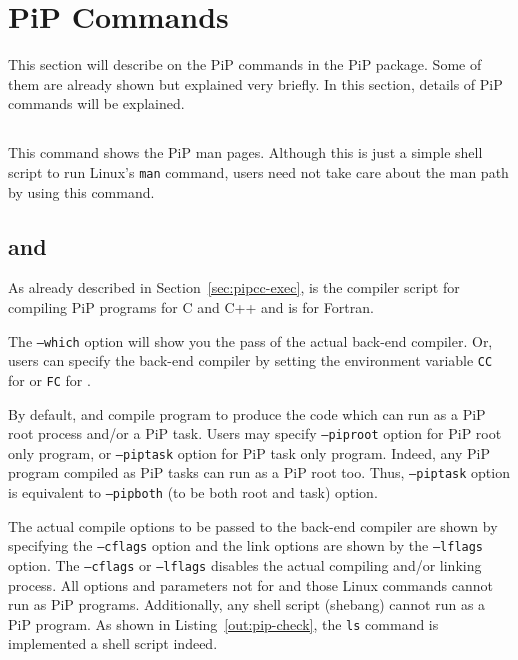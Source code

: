 
\section{PiP Commands}

This section will describe on the PiP commands in the PiP
package. Some of them are already shown but explained very briefly. In
this section, details of PiP commands will be explained.

\subsection{}\label{sec:pip-man}

This command shows the PiP man pages. Although this is just a simple
shell script to run Linux's {\tt man} command, users need not take 
care about the man path by using this command.

\subsection{ and }

As already described in Section~\ref{sec:pipcc-exec}, 
is the compiler script for compiling PiP programs for C and C++ and
 is for Fortran.

The {\tt --which} option will show you the pass of the actual back-end
compiler. Or, users can specify the back-end compiler by setting the 
environment variable {\tt CC} for  or {\tt FC} for
.

By default,  and  compile program to
produce the code which can run as a PiP root process and/or a PiP
task. Users may specify {\tt --piproot} option for PiP root only
program, or {\tt --piptask} option for PiP task only program. Indeed,
any PiP program compiled as PiP tasks can run as a PiP root too. Thus,
{\tt --piptask} option is equivalent to {\tt --pipboth} (to
be both root and task) option.

The actual compile options to be passed to the back-end compiler are
shown by 
specifying the {\tt --cflags} option and the link options are shown by
the {\tt --lflags} option. The {\tt --cflags} or {\tt --lflags}
disables the actual compiling and/or linking process.
All options and parameters not for  and those Linux
commands cannot run as PiP 
programs. Additionally, any shell script (shebang) cannot run as a PiP
program. As shown in Listing~\ref{out:pip-check}, the {\tt ls} command
is implemented a shell script indeed.

